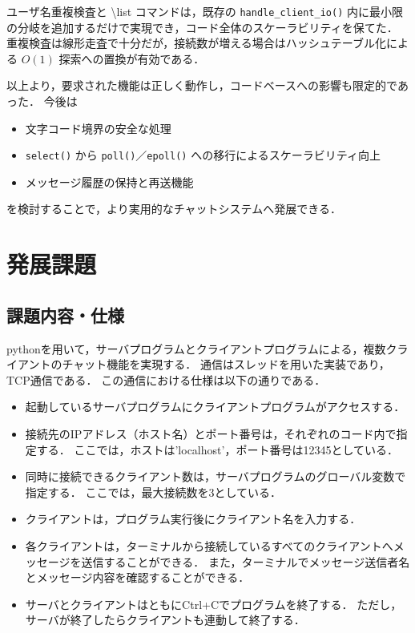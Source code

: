 \documentclass[a4j,10pt]{jarticle}
\begin{document}
ユーザ名重複検査と \textbackslash list コマンドは，既存の \texttt{handle\_client\_io()} 内に最小限の分岐を追加するだけで実現でき，コード全体のスケーラビリティを保てた．
重複検査は線形走査で十分だが，接続数が増える場合はハッシュテーブル化による $O(1)$ 探索への置換が有効である．

以上より，要求された機能は正しく動作し，コードベースへの影響も限定的であった．
今後は
\begin{itemize}
  \item 文字コード境界の安全な処理
  \item \texttt{select()} から \texttt{poll()}／\texttt{epoll()} への移行によるスケーラビリティ向上
  \item メッセージ履歴の保持と再送機能
\end{itemize}
を検討することで，より実用的なチャットシステムへ発展できる．



\section{発展課題}
\subsection{課題内容・仕様}
pythonを用いて，サーバプログラムとクライアントプログラムによる，複数クライアントのチャット機能を実現する．
通信はスレッドを用いた実装であり，TCP通信である．
この通信における仕様は以下の通りである．
\begin{itemize}
  \item 起動しているサーバプログラムにクライアントプログラムがアクセスする．
  \item 接続先のIPアドレス（ホスト名）とポート番号は，それぞれのコード内で指定する．
    ここでは，ホストは'localhost'，ポート番号は12345としている．
  \item 同時に接続できるクライアント数は，サーバプログラムのグローバル変数で指定する．
    ここでは，最大接続数を3としている．
  \item クライアントは，プログラム実行後にクライアント名を入力する．
  \item 各クライアントは，ターミナルから接続しているすべてのクライアントへメッセージを送信することができる．
    また，ターミナルでメッセージ送信者名とメッセージ内容を確認することができる．
  \item サーバとクライアントはともにCtrl+Cでプログラムを終了する．
    ただし，サーバが終了したらクライアントも連動して終了する．
\end{itemize}
\end{document}
